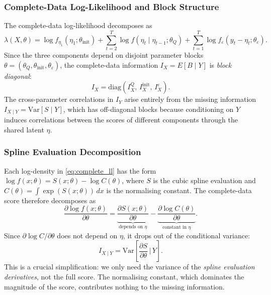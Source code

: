 \documentclass[12pt]{article}
\begin{document}
\subsubsection*{Complete-Data Log-Likelihood and Block Structure}

The complete-data log-likelihood decomposes as
\begin{equation}\label{eq:complete_ll}
\lambda(X, \theta) = \log f_{\eta_1}(\eta_1; \theta_{\text{init}})
+ \sum_{t=2}^T \log f(\eta_t \mid \eta_{t-1}; \theta_Q)
+ \sum_{t=1}^T \log f_\varepsilon(y_t - \eta_t; \theta_\varepsilon).
\end{equation}
Since the three components depend on disjoint parameter blocks
$\theta = (\theta_Q, \theta_{\text{init}}, \theta_\varepsilon)$,
the complete-data information $I_X = E[B \mid Y]$ is \emph{block diagonal}:
\[
I_X = \text{diag}(I_X^Q, \, I_X^{\text{init}}, \, I_X^\varepsilon).
\]
The cross-parameter correlations in $I_Y$ arise entirely from the missing
information $I_{X \mid Y} = \text{Var}[S \mid Y]$, which has off-diagonal
blocks because conditioning on $Y$ induces correlations between the
scores of different components through the shared latent $\eta$.

\subsubsection*{Spline Evaluation Decomposition}

Each log-density in \eqref{eq:complete_ll} has the form
$\log f(x; \theta) = S(x; \theta) - \log C(\theta)$,
where $S$ is the cubic spline evaluation and
$C(\theta) = \int \exp(S(x;\theta))\,dx$ is the normalising constant.
The complete-data score therefore decomposes as
\begin{equation}\label{eq:score_decomp}
\frac{\partial \log f(x;\theta)}{\partial \theta}
= \underbrace{\frac{\partial S(x;\theta)}{\partial \theta}}_{\text{depends on }\eta}
- \underbrace{\frac{\partial \log C(\theta)}{\partial \theta}}_{\text{constant in }\eta}.
\end{equation}
Since $\partial \log C / \partial \theta$ does not depend on $\eta$,
it drops out of the conditional variance:
\begin{equation}\label{eq:var_decomp}
I_{X \mid Y} = \text{Var}\!\left[\frac{\partial S}{\partial \theta}\,\bigg|\, Y\right].
\end{equation}
This is a crucial simplification: we only need the variance of the
\emph{spline evaluation derivatives}, not the full score.
The normalising constant, which dominates the magnitude of the score,
contributes nothing to the missing information.
\end{document}
